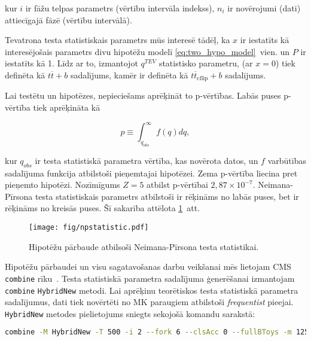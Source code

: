 \noindent kur $i$ ir fāžu telpas parametrs (vērtību intervāla indekss), $n_{i}$ ir novērojumi (dati) attiecīgajā fāzē (vērtību intervālā).

Tevatrona testa statistiskais parametrs mūs interesē tādēļ, ka $x$ ir iestatīts kā interesējošais parametrs divu hipotēžu modelī \ref{eq:two_hypo_model}~vien. un $P$ ir iestatīts kā 1. Līdz ar to, izmantojot $q^{TEV}$ statistisko parametru, \Hnull (ar $x=0$) tiek definēta kā $t\overline{t}+b$ sadalījums, kamēr \Halt ir definēta kā $t\overline{t}_{\text{cflip}}+b$ sadalījums.

Lai testētu \Hnull un \Halt hipotēzes, nepieciešams aprēķināt to p-vērtības. Labās puses p-vērtība tiek aprēķināta kā

\begin{equation}
p\equiv\int_{q_{obs}}^{\infty}f(q)dq,
\end{equation}
    
\noindent kur $q_{obs}$ ir testa statistiskā parametra vērtība, kas novērota datos, un $f$ varbūtības sadalījuma funkcija atbilstoši pieņemtajai hipotēzei. Zema p-vērtība liecina pret pieņemto hipotēzi. Nozīmīgums $Z=5$ atbilst p-vērtībai $2,87\times10^{-7}$. Neimana-Pīrsona testa statistiskais parametrs atbilstoši \Hnull ir rēķināms no labās puses, bet \Halt ir rēķināms no kreisās puses. Šī sakarība attēlota \ref{fig:npstatistic}~att.

\begin{figure}
  \centering
  \texttt{[image: fig/npstatistic.pdf]}
  \caption{Hipotēžu pārbaude atbilsoši Neimana-Pīrsona testa statistikai.}
  \label{fig:npstatistic}
\end{figure}

Hipotēžu pārbaudei un visu sagatavošanas darbu veikšanai mēs lietojam CMS \lstinline[language=sh]|combine| rīku~\cite{url:combine}.
Testa statistiskā parametra sadalījuma ģenerēšanai izmantojam  \lstinline[language=sh]|combine| \lstinline[language=sh]|HybridNew| metodi. Lai aprēķinu teorētiskos testa statistiskā parametra sadalījumus, dati tiek novērtēti no MK paraugiem atbilstoši \textit{frequentist} pieejai. \lstinline[language=sh]|HybridNew| metodes pielietojums sniegts sekojošā komandu sarakstā:

\begin{lstlisting}[language=sh, breaklines=true]
  combine -M HybridNew -T 500 -i 2 --fork 6 --clsAcc 0 --fullBToys -m 125.7 TwoHypo.root --seed 8192 --testStat=TEV  --saveHybridResult --singlePoint 1
\end{lstlisting}

